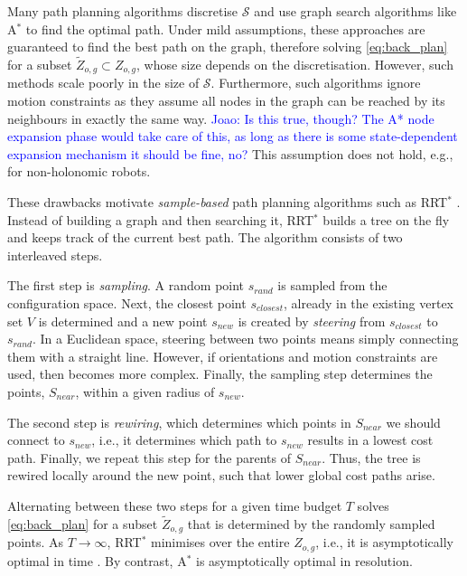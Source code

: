 \documentclass{article}  %
\newcommand{\jm}[1]{\textcolor{blue}{Joao: #1}}
\begin{document}
Many path planning algorithms discretise $\mathcal{S}$ and use graph search algorithms like A$^*$ to find the optimal path. Under mild assumptions, these approaches are guaranteed to find the best path on the graph, therefore solving \eqref{eq:back_plan} for a subset $\tilde{Z}_{o,g} \subset Z_{o,g}$, whose size depends on the discretisation. However, such methods scale poorly in the size of $\mathcal{S}$. Furthermore, such algorithms ignore motion constraints as they assume all nodes in the graph can be reached by its neighbours in exactly the same way. \jm{Is this true, though? The A* node expansion phase would take care of this, as long as there is some state-dependent expansion mechanism it should be fine, no?} This assumption does not hold, e.g., for non-holonomic robots.

These drawbacks motivate \emph{sample-based} path planning algorithms such as RRT$^*$  \cite{karaman2011sampling}. Instead of building a graph and then searching it, RRT$^*$ builds a tree on the fly and keeps track of the current best path. The algorithm consists of two interleaved steps. 

The first step is \emph{sampling}. A random point $s_{rand}$ is sampled from the configuration space. Next, the closest point $s_{closest}$, already in the existing vertex set $V$ is determined and a new point $s_{new}$ is created by \emph{steering} from  $s_{closest}$ to $s_{rand}$. In a Euclidean space, steering between two points means simply connecting them with a straight line. However, if orientations and motion constraints are used, then becomes more complex. Finally, the sampling step determines the points, $S_{near}$, within a given radius of $s_{new}$.

The second step is \emph{rewiring}, which determines which points in $S_{near}$ we should connect to $s_{new}$, i.e., it determines which path to $s_{new}$ results in a lowest cost path. Finally, we repeat this step for the parents of $S_{near}$. Thus, the tree is rewired locally around the new point, such that lower global cost paths arise.

Alternating between these two steps for a given time budget $T$ solves \eqref{eq:back_plan} for a subset $\tilde{Z}_{o,g}$ that is determined by the randomly sampled points. As $T \rightarrow \infty$, RRT$^*$ minimises over the entire $Z_{o,g}$, i.e., it is asymptotically optimal in time \cite{karaman2011sampling}. By contrast, A$^*$ is asymptotically optimal in resolution.


\end{document}
